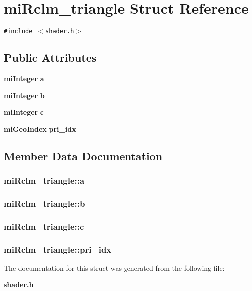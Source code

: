 \section{mi\-Rclm\_\-triangle Struct Reference}
\label{structmiRclm__triangle}
{\tt \#include $<$shader.h$>$}

\subsection*{Public Attributes}
\begin{CompactItemize}
\item 
{\bf mi\-Integer} {\bf a}
\item 
{\bf mi\-Integer} {\bf b}
\item 
{\bf mi\-Integer} {\bf c}
\item 
{\bf mi\-Geo\-Index} {\bf pri\_\-idx}
\end{CompactItemize}


\subsection{Member Data Documentation}
\subsubsection{ {\bf mi\-Rclm\_\-triangle::a}}\label{structmiRclm__triangle_o0}


\subsubsection{ {\bf mi\-Rclm\_\-triangle::b}}\label{structmiRclm__triangle_o1}


\subsubsection{ {\bf mi\-Rclm\_\-triangle::c}}\label{structmiRclm__triangle_o2}


\subsubsection{ {\bf mi\-Rclm\_\-triangle::pri\_\-idx}}\label{structmiRclm__triangle_o3}




The documentation for this struct was generated from the following file:\begin{CompactItemize}
\item 
{\bf shader.h}\end{CompactItemize}
